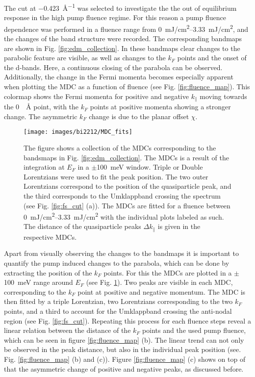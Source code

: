 The cut at \qty{-0.423}{\angstrom^{-1}} was selected to investigate the the out of equilibrium response in the high pump fluence regime.
For this reason a pump fluence dependence was performed in a fluence range from \qtyrange{0}{3.33}{\milli\joule/\centi\meter\squared}, and the changes of the band structure were recorded.
The corresponding bandmaps are shown in Fig. \ref{fig:edm_collection}.
In these bandmaps clear changes to the parabolic feature are visible, as well as changes to the $k_F$ points and the onset of the  d-bands.
Here, a continuous closing of the parabola can be observed.
Additionally, the change in the Fermi momenta becomes especially apparent when plotting the MDC as a function of fluence (see Fig. \ref{fig:fluence_map}).
This colormap shows the Fermi momenta for positive and negative $k_\parallel$ moving towards the \qty{0}{\per\angstrom} point, with the $k_F$ points at positive momenta showing a stronger change.
The asymmetric $k_F$ change is due to the planar offset $\chi$.

\begin{figure}[t]
	\centering
	\texttt{[image: images/bi2212/MDC\_fits]}
	\caption{The figure shows a collection of the MDCs corresponding to the bandsmaps in Fig. \ref{fig:edm_collection}. The MDCs is a result of the integration at $E_F$ in a $\pm$\qty{100}{\milli\electronvolt} window. Triple or Double Lorentzians were used to fit the peak position. The two outer Lorentzians correspond to the position of the quasiparticle peak, and the third corresponds to the Umklappband crossing the spectrum (see Fig. \ref{fig:fs_cut} (a)). The MDCs are fitted for a fluence between \qtyrange{0}{3.33}{\milli\joule/\centi\meter\squared} with the individual plots labeled as such. The distance of the quasiparticle peaks $\Delta k_\parallel$ is given in the respective MDCs.}
	\label{fig:mdc_fits}
\end{figure}

Apart from visually observing the changes to the bandmaps it is important to quantify the pump induced changes to the parabola, which can be done by extracting the position of the $k_F$ points.
For this the MDCs are plotted in a $\pm$\qty{100}{\milli\electronvolt} range around $E_F$ (see Fig. \ref{fig:mdc_fits}).
Two peaks are visible in each MDC, corresponding to the $k_F$ point at positive and negative momentum.
The MDC is then fitted by a triple Lorentzian, two Lorentzians corresponding to the two $k_F$ points, and a third to account for the Umklappband crossing the anti-nodal region (see Fig. \ref{fig:fs_cut}).
Repeating this process for each fluence steps reveal a linear relation between the distance of the $k_F$ points and the used pump fluence, which can be seen in figure \ref{fig:fluence_map} (b).
The linear trend can not only be observed in the peak distance, but also in the individual peak position (see. Fig. \ref{fig:fluence_map} (b) and (c)).
Figure \ref{fig:fluence_map} (c) shows on top of that the asymmetric change of positive and negative peaks, as discussed before.

